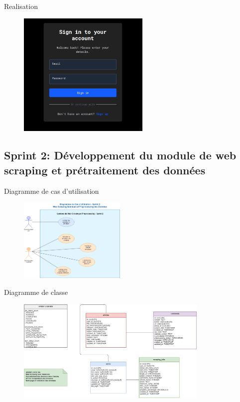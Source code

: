 \begin{frame}{Realisation}
    \begin{figure}[H]
        \centering
        \includegraphics[height=6cm]{assets/images/signin-ui.png}
    \end{figure}
\end{frame}


\subsection{Sprint 2: Développement du module de web scraping et prétraitement des données}
\begin{frame}{Diagramme de cas d'utilisation}

    \begin{figure}[H]
        \centering
        \includegraphics[height=4cm]{assets/images/sprint2-usecase.png}
    \end{figure}
\end{frame}

\begin{frame}{Diagramme de classe}

    \begin{figure}[H]
        \centering
        \includegraphics[height=5cm]{assets/images/sprint2-class.png}
    \end{figure}
\end{frame}

